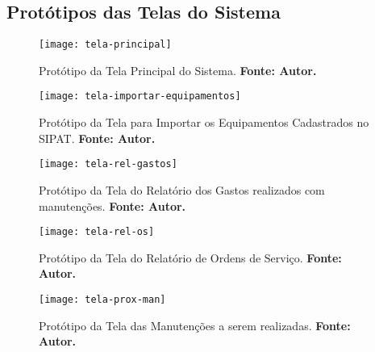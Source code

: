 \begin{apendicesenv}

\chapter{Protótipos das Telas do Sistema}

\graphicspath{{figuras/prototipos/}}
\begin{figure}[H]
\centering
\texttt{[image: tela-principal]}
\caption{Protótipo da Tela Principal do Sistema. \textbf{Fonte: Autor.}}
\label{tela-principal}
\end{figure}


\graphicspath{{figuras/prototipos/}}
\begin{figure}[H]
\centering
\texttt{[image: tela-importar-equipamentos]}
\caption{Protótipo da Tela para Importar os Equipamentos Cadastrados no SIPAT. \textbf{Fonte: Autor.}}
\label{tela-importar-equipamentos}
\end{figure}


\graphicspath{{figuras/prototipos/}}
\begin{figure}[H]
\centering
\texttt{[image: tela-rel-gastos]}
\caption{Protótipo da Tela do Relatório dos Gastos realizados com manutenções. \textbf{Fonte: Autor.}}
\label{tela-rel-gastos}
\end{figure}

\graphicspath{{figuras/prototipos/}}
\begin{figure}[H]
\centering
\texttt{[image: tela-rel-os]}
\caption{Protótipo da Tela do Relatório de Ordens de Serviço. \textbf{Fonte: Autor.}}
\label{tela-rel-os}
\end{figure}


\graphicspath{{figuras/prototipos/}}
\begin{figure}[H]
\centering
\texttt{[image: tela-prox-man]}
\caption{Protótipo da Tela das Manutenções a serem realizadas. \textbf{Fonte: Autor.}}
\label{tela-prox-man}
\end{figure}


\end{apendicesenv}
